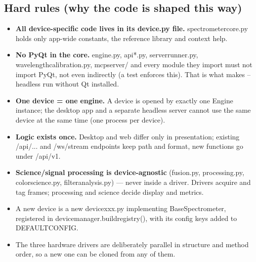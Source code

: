 \documentclass[12pt,a4paper]{article}
\DeclareRobustCommand{\code}[1]{{\ttfamily\small\def\_{\rawus\allowbreak}#1}}
\DeclareRobustCommand{\file}[1]{{\ttfamily\small\def\_{\rawus\allowbreak}#1}}
\begin{document}
\subsection{Hard rules (why the code is shaped this way)}
\begin{itemize}
  \item \textbf{All device-specific code lives in its \file{\_device\_*.py} file.}
        \file{spectrometer\_core.py} holds only app-wide constants, the reference
        library and context help.
  \item \textbf{No PyQt in the core.} \file{engine.py}, \file{api*.py},
        \file{server\_runner.py}, \file{wavelength\_calibration.py},
        \file{mcp\_server/} and every module they import must not import PyQt, not
        even indirectly (a test enforces this). That is what makes
        \code{--headless} run without Qt installed.
  \item \textbf{One device = one engine.} A device is opened by exactly one
        \code{Engine} instance; the desktop app and a separate headless server
        cannot use the same device at the same time (one process per device).
  \item \textbf{Logic exists once.} Desktop and web differ only in presentation;
        existing \code{/api/...} and \code{/ws/stream} endpoints keep path and
        format, new functions go under \code{/api/v1}.
  \item \textbf{Science/signal processing is device-agnostic}
        (\file{fusion.py}, \file{processing.py}, \file{color\_science.py},
        \file{filter\_analysis.py}) --- never inside a driver. Drivers acquire and
        tag frames; processing and science decide display and metrics.
  \item A new device is a new \file{\_device\_xxx.py} implementing
        \code{BaseSpectrometer}, registered in \code{device\_manager.build\_registry()},
        with its config keys added to \code{DEFAULT\_CONFIG}.
  \item The three hardware drivers are deliberately parallel in structure and
        method order, so a new one can be cloned from any of them.
\end{itemize}
\end{document}
